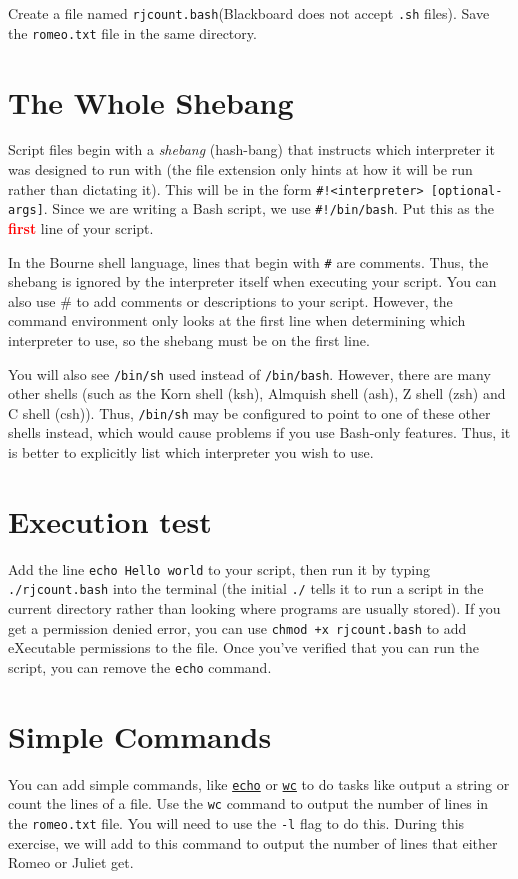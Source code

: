 \documentclass[12pt]{article}
\newcommand{\code}[1]{\texttt{#1}}
\newcommand{\filename}{\code{rjcount.bash}\xspace}
\begin{document}
Create a file named \filename (Blackboard does not accept \code{.sh} files).  Save the \code{romeo.txt} file in the same directory.

\section*{The Whole Shebang}

Script files begin with a \emph{shebang} (hash-bang) that instructs which interpreter it was designed to run with (the file extension only hints at how it will be run rather than dictating it).
This will be in the form \code{\#!<interpreter> [optional-args]}.
Since we are writing a Bash script, we use \code{\#!/bin/bash}.
Put this as the \textbf{\textcolor{red}{first}} line of your script.

In the Bourne shell language, lines that begin with \code{\#} are comments.
Thus, the shebang is ignored by the interpreter itself when executing your script.
You can also use \# to add comments or descriptions to your script.
However, the command environment only looks at the first line when determining which interpreter to use, so the shebang must be on the first line.


You will also see \code{/bin/sh} used instead of \code{/bin/bash}.
However, there are many other shells (such as the Korn shell (ksh), Almquish shell (ash), Z shell (zsh) and C shell (csh)).
Thus, \code{/bin/sh} may be configured to point to one of these other shells instead, which would cause problems if you use Bash-only features.
Thus, it is better to explicitly list which interpreter you wish to use.

\section*{Execution test}
Add the line \code{echo Hello world} to your script, then run it by typing \code{./\filename} into the terminal 
(the initial \code{./} tells it to run a script in the current directory rather than looking where programs are usually stored).
If you get a permission denied error, you can use \code{chmod +x \filename} to add eXecutable permissions to the file.
Once you've verified that you can run the script, you can remove the \code{echo} command.

\section*{Simple Commands}
You can add simple commands, like \href{https://en.wikipedia.org/wiki/Echo_(command)}{\code{echo}} or \href{https://en.wikipedia.org/wiki/Wc_(Unix)}{\code{wc}} to do tasks like output a string or count the lines of a file.
Use the \code{wc} command to output the number of lines in the \code{romeo.txt} file.
You will need to use the \code{-l} flag to do this.
During this exercise, we will add to this command to output the number of lines that either Romeo or Juliet get.
\end{document}
